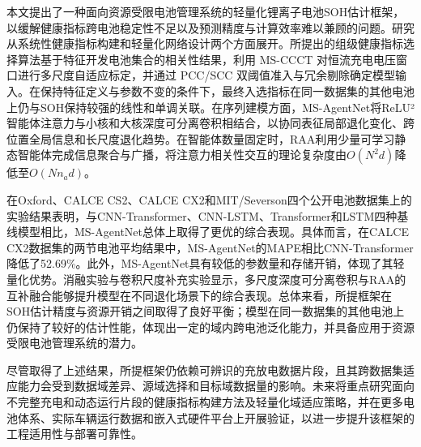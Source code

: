 本文提出了一种面向资源受限电池管理系统的轻量化锂离子电池SOH估计框架，以缓解健康指标跨电池稳定性不足以及预测精度与计算效率难以兼顾的问题。研究从系统性健康指标构建和轻量化网络设计两个方面展开。所提出的组级健康指标选择算法基于特征开发电池集合的相关性结果，利用 MS-CCCT 对恒流充电电压窗口进行多尺度自适应标定，并通过 PCC/SCC 双阈值准入与冗余剔除确定模型输入。在保持特征定义与参数不变的条件下，最终入选指标在同一数据集的其他电池上仍与SOH保持较强的线性和单调关联。在序列建模方面，MS-AgentNet将ReLU²智能体注意力与小核和大核深度可分离卷积相结合，以协同表征局部退化变化、跨位置全局信息和长尺度退化趋势。在智能体数量固定时，RAA利用少量可学习静态智能体完成信息聚合与广播，将注意力相关性交互的理论复杂度由$O(N^2d)$降低至$O(Nn_a d)$。

在Oxford、CALCE CS2、CALCE CX2和MIT/Severson四个公开电池数据集上的实验结果表明，与CNN-Transformer、CNN-LSTM、Transformer和LSTM四种基线模型相比，MS-AgentNet总体上取得了更优的综合表现。具体而言，在CALCE CX2数据集的两节电池平均结果中，MS-AgentNet的MAPE相比CNN-Transformer降低了52.69\%。此外，MS-AgentNet具有较低的参数量和存储开销，体现了其轻量化优势。消融实验与卷积尺度补充实验显示，多尺度深度可分离卷积与RAA的互补融合能够提升模型在不同退化场景下的综合表现。总体来看，所提框架在SOH估计精度与资源开销之间取得了良好平衡；模型在同一数据集的其他电池上仍保持了较好的估计性能，体现出一定的域内跨电池泛化能力，并具备应用于资源受限电池管理系统的潜力。

尽管取得了上述结果，所提框架仍依赖可辨识的充放电数据片段，且其跨数据集适应能力会受到数据域差异、源域选择和目标域数据量的影响。未来将重点研究面向不完整充电和动态运行片段的健康指标构建方法及轻量化域适应策略，并在更多电池体系、实际车辆运行数据和嵌入式硬件平台上开展验证，以进一步提升该框架的工程适用性与部署可靠性。
